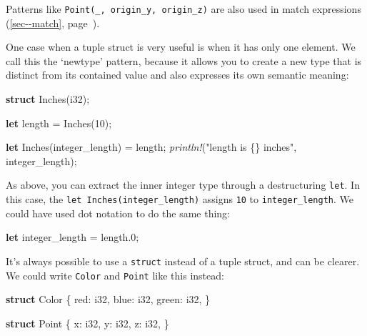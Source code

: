 \documentclass[a4paper,]{book}
\renewcommand*{\hyperlink}[2]{%
 #2 (\autoref{#1}, page~\pageref{#1})}
\newenvironment{Shaded}{\begin{snugshade}}{\end{snugshade}}
\newcommand{\KeywordTok}[1]{\textcolor[rgb]{0.13,0.29,0.53}{\textbf{{#1}}}}
\newcommand{\DataTypeTok}[1]{\textcolor[rgb]{0.13,0.29,0.53}{{#1}}}
\newcommand{\DecValTok}[1]{\textcolor[rgb]{0.00,0.00,0.81}{{#1}}}
\newcommand{\StringTok}[1]{\textcolor[rgb]{0.31,0.60,0.02}{{#1}}}
\newcommand{\PreprocessorTok}[1]{\textcolor[rgb]{0.56,0.35,0.01}{\textit{{#1}}}}
\newcommand{\NormalTok}[1]{{#1}}
\begin{document}
Patterns like \texttt{Point(\_,\ origin\_y,\ origin\_z)} are also used
in \protect\hyperlink{sec--match}{match expressions}.

One case when a tuple struct is very useful is when it has only one
element. We call this the `newtype' pattern, because it allows you to
create a new type that is distinct from its contained value and also
expresses its own semantic meaning:

\begin{Shaded}
\begin{Highlighting}[]
\KeywordTok{struct} \NormalTok{Inches(}\DataTypeTok{i32}\NormalTok{);}

\KeywordTok{let} \NormalTok{length = Inches(}\DecValTok{10}\NormalTok{);}

\KeywordTok{let} \NormalTok{Inches(integer_length) = length;}
\PreprocessorTok{println!}\NormalTok{(}\StringTok{"length is \{\} inches"}\NormalTok{, integer_length);}
\end{Highlighting}
\end{Shaded}

As above, you can extract the inner integer type through a destructuring
\texttt{let}. In this case, the \texttt{let\ Inches(integer\_length)}
assigns \texttt{10} to \texttt{integer\_length}. We could have used dot
notation to do the same thing:

\begin{Shaded}
\begin{Highlighting}[]
\KeywordTok{let} \NormalTok{integer_length = length.}\DecValTok{0}\NormalTok{;}
\end{Highlighting}
\end{Shaded}

It's always possible to use a \texttt{struct} instead of a tuple struct,
and can be clearer. We could write \texttt{Color} and \texttt{Point}
like this instead:

\begin{Shaded}
\begin{Highlighting}[]
\KeywordTok{struct} \NormalTok{Color \{}
    \NormalTok{red: }\DataTypeTok{i32}\NormalTok{,}
    \NormalTok{blue: }\DataTypeTok{i32}\NormalTok{,}
    \NormalTok{green: }\DataTypeTok{i32}\NormalTok{,}
\NormalTok{\}}

\KeywordTok{struct} \NormalTok{Point \{}
    \NormalTok{x: }\DataTypeTok{i32}\NormalTok{,}
    \NormalTok{y: }\DataTypeTok{i32}\NormalTok{,}
    \NormalTok{z: }\DataTypeTok{i32}\NormalTok{,}
\NormalTok{\}}
\end{Highlighting}
\end{Shaded}
\end{document}
